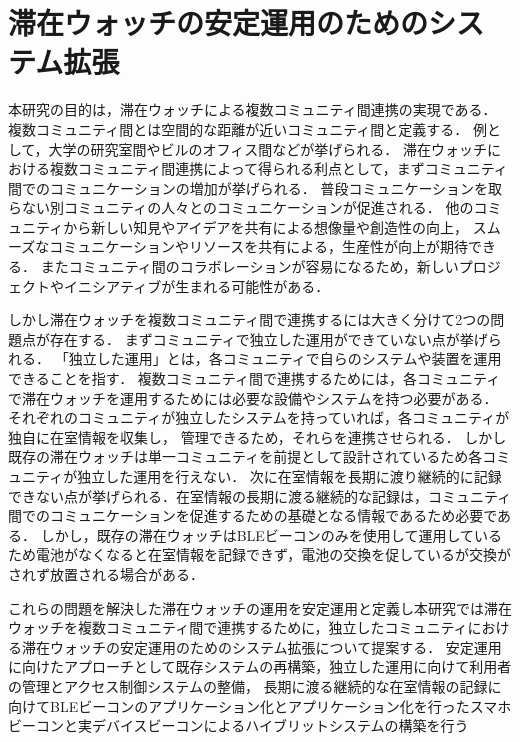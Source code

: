 \section{滞在ウォッチの安定運用のためのシステム拡張}\label{1.2}

本研究の目的は，滞在ウォッチによる複数コミュニティ間連携の実現である．
複数コミュニティ間とは空間的な距離が近いコミュニティ間と定義する．
例として，大学の研究室間やビルのオフィス間などが挙げられる．
滞在ウォッチにおける複数コミュニティ間連携によって得られる利点として，まずコミュニティ間でのコミュニケーションの増加が挙げられる．
普段コミュニケーションを取らない別コミュニティの人々とのコミュニケーションが促進される．
他のコミュニティから新しい知見やアイデアを共有による想像量や創造性の向上，
スムーズなコミュニケーションやリソースを共有による，生産性が向上が期待できる．
またコミュニティ間のコラボレーションが容易になるため，新しいプロジェクトやイニシアティブが生まれる可能性がある．

しかし滞在ウォッチを複数コミュニティ間で連携するには大きく分けて2つの問題点が存在する．
まずコミュニティで独立した運用ができていない点が挙げられる．
「独立した運用」とは，各コミュニティで自らのシステムや装置を運用できることを指す．
複数コミュニティ間で連携するためには，各コミュニティで滞在ウォッチを運用するためには必要な設備やシステムを持つ必要がある．
それぞれのコミュニティが独立したシステムを持っていれば，各コミュニティが独自に在室情報を収集し，
管理できるため，それらを連携させられる．
しかし既存の滞在ウォッチは単一コミュニティを前提として設計されているため各コミュニティが独立した運用を行えない．
次に在室情報を長期に渡り継続的に記録できない点が挙げられる．在室情報の長期に渡る継続的な記録は，コミュニティ間でのコミュニケーションを促進するための基礎となる情報であるため必要である．
しかし，既存の滞在ウォッチはBLEビーコンのみを使用して運用しているため電池がなくなると在室情報を記録できず，電池の交換を促しているが交換がされず放置される場合がある．

これらの問題を解決した滞在ウォッチの運用を安定運用と定義し本研究では滞在ウォッチを複数コミュニティ間で連携するために，独立したコミュニティにおける滞在ウォッチの安定運用のためのシステム拡張について提案する．
安定運用に向けたアプローチとして既存システムの再構築，独立した運用に向けて利用者の管理とアクセス制御システムの整備，
長期に渡る継続的な在室情報の記録に向けてBLEビーコンのアプリケーション化とアプリケーション化を行ったスマホビーコンと実デバイスビーコンによるハイブリットシステムの構築を行う





